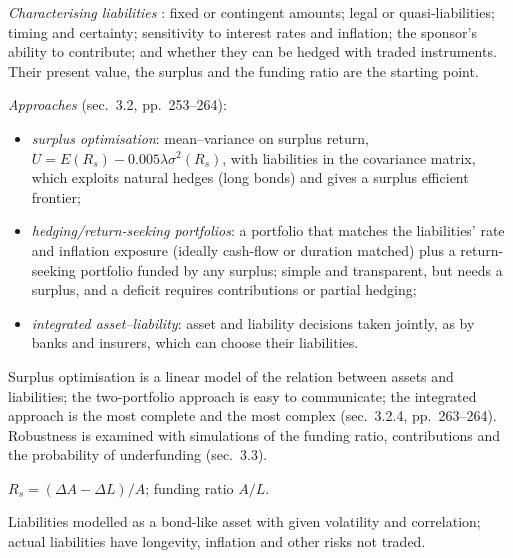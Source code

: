 \begin{qfmethod}\label{meth:liability-relative-allocation}
 \emph{Characterising liabilities} \citep[chap.~6, sec.~3.1, pp.~250--253]{portfolio-management-in-practice-v1-2020}: fixed or contingent amounts; legal or quasi-liabilities; timing and certainty; sensitivity to interest rates and inflation; the sponsor's ability to contribute; and whether they can be hedged with traded instruments. Their present value, the surplus and the funding ratio are the starting point.

\emph{Approaches} (sec.~3.2, pp.~253--264):
\begin{itemize}
\item \emph{surplus optimisation}: mean--variance on surplus return, $U=E(R_s)-0.005\lambda\sigma^2(R_s)$, with liabilities in the covariance matrix, which exploits natural hedges (long bonds) and gives a surplus efficient frontier;
\item \emph{hedging/return-seeking portfolios}: a portfolio that matches the liabilities' rate and inflation exposure (ideally cash-flow or duration matched) plus a return-seeking portfolio funded by any surplus; simple and transparent, but needs a surplus, and a deficit requires contributions or partial hedging;
\item \emph{integrated asset--liability}: asset and liability decisions taken jointly, as by banks and insurers, which can choose their liabilities.
\end{itemize}
Surplus optimisation is a linear model of the relation between assets and liabilities; the two-portfolio approach is easy to communicate; the integrated approach is the most complete and the most complex (sec.~3.2.4, pp.~263--264). Robustness is examined with simulations of the funding ratio, contributions and the probability of underfunding (sec.~3.3).

 $R_s=(\Delta A-\Delta L)/A$; funding ratio $A/L$.

 Liabilities modelled as a bond-like asset with given volatility and correlation; actual liabilities have longevity, inflation and other risks not traded.


\end{qfmethod}

